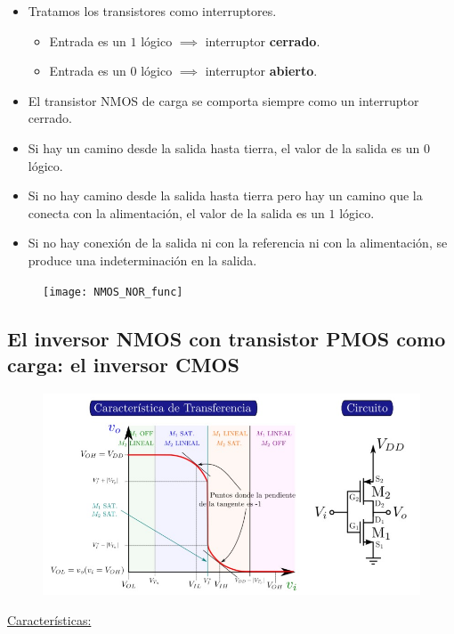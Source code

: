 \documentclass[10pt,a4paper]{article}
\begin{document}
	\begin{itemize}
		\item Tratamos los transistores como interruptores.
		\begin{itemize}
			\item Entrada es un $1$ lógico $\implies$ interruptor \textbf{cerrado}.
			\item Entrada es un $0$ lógico $\implies$ interruptor \textbf{abierto}.
		\end{itemize}
		\item El transistor NMOS de carga se comporta siempre como un interruptor cerrado.
		\item Si hay un camino desde la salida hasta tierra, el valor de la salida es un $0$ lógico.
		\item Si no hay camino desde la salida hasta tierra pero hay un camino que la conecta con la alimentación, el valor de la salida es un $1$ lógico.
		\item Si no hay conexión de la salida ni con la referencia ni con la alimentación, se produce una indeterminación en la salida.
	\end{itemize}

	\begin{figure}[h]
		\centering
		\texttt{[image: NMOS\_NOR\_func]}
	\end{figure}

	\newpage
	\subsection{El inversor NMOS con transistor PMOS como carga: el inversor CMOS}
	
	\begin{figure}[h]
		\centering
		\includegraphics[scale = 0.45]{CMOS}
	\end{figure}
	
	\underline{Características:}
	
\end{document}
